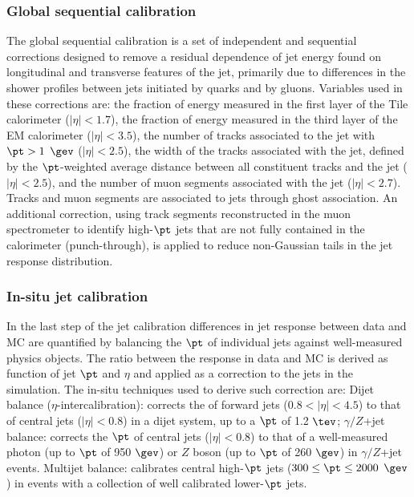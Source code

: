 \subsubsection{Global sequential calibration}
The global sequential calibration is a set of independent and sequential corrections designed to remove a residual dependence of jet energy found on longitudinal and transverse features of the jet, primarily due to differences in the shower profiles between jets initiated by quarks and by gluons.  
Variables used in these corrections are:
\bi
\ib the fraction of energy measured in the first layer of the Tile calorimeter ($|\eta|<1.7$),
\ib the fraction of energy measured in the third layer of the EM calorimeter ($|\eta|<3.5$),
\ib the number of tracks associated to the jet with $\pt > 1$ $\gev$ ($|\eta|<2.5$),
\ib the width of the tracks associated with the jet, defined by the $\pt$-weighted average distance between all constituent tracks and the jet ($|\eta|<2.5$), and
\ib the number of muon segments associated with the jet ($|\eta|<2.7$).
\ei
Tracks and muon segments are associated to jets through ghost association. An additional correction, using track segments reconstructed in the muon spectrometer to identify high-$\pt$ jets that are not fully contained in the calorimeter (punch-through), is applied to reduce non-Gaussian tails in the jet response distribution. 

\subsubsection{In-situ jet calibration}
In the last step of the jet calibration differences in jet response between data and MC are quantified by balancing the $\pt$ of individual jets against well-measured physics objects. The ratio between the response in data and MC is derived as function of jet $\pt$ and $\eta$ and applied as a correction to the jets in the simulation. The in-situ techniques \cite{ATLAS-CONF-2015-037} used to derive such correction are:
\bi
\ib Dijet balance ($\eta$-intercalibration): corrects the \pt of forward jets ($0.8<|\eta|<4.5$) to that of central jets ($|\eta|<0.8$) in a dijet system, up to a $\pt$ of 1.2 $\tev$;
\ib $\gamma/Z$+jet balance: corrects the $\pt$ of central jets ($|\eta|<0.8$) to that of a well-measured photon (up to $\pt$ of 950 $\gev$) or $Z$ boson (up to $\pt$ of 260 $\gev$) in $\gamma/Z$+jet events.
\ib Multijet balance: calibrates central high-$\pt$ jets ($300 \le \pt \le 2000$ $\gev$) in events with a collection of well calibrated lower-$\pt$ jets.
\ei

